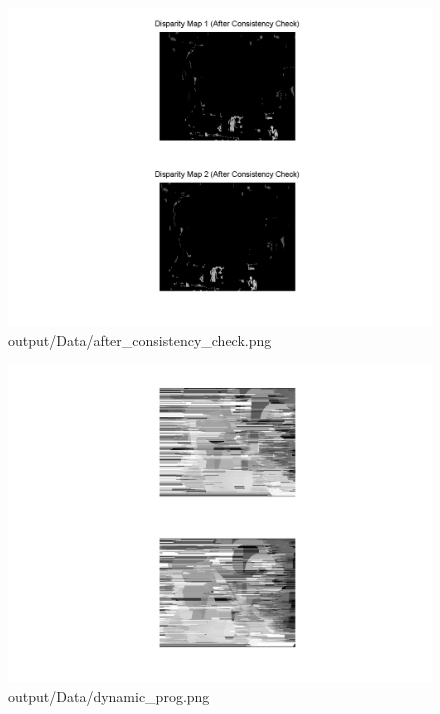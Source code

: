 \begin{figure}[h]    \includegraphics[scale=0.5]{output/Data/after_consistency_check.png}    \caption{output/Data/after\_consistency\_check.png}\end{figure}
\begin{figure}[h]    \includegraphics[scale=0.5]{output/Data/dynamic_prog.png}    \caption{output/Data/dynamic\_prog.png}\end{figure}
